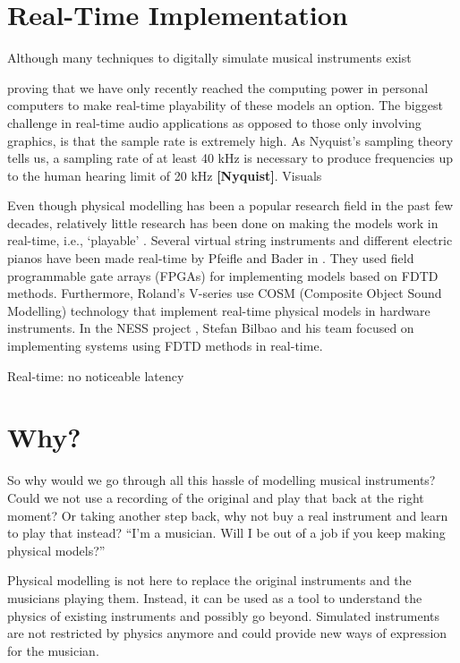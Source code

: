 \section{Real-Time Implementation}
Although many techniques to digitally simulate musical instruments exist

proving that we have only recently reached the computing power in personal computers to make real-time playability of these models an option. The biggest challenge in real-time audio applications as opposed to those only involving graphics, is that the sample rate is extremely high. As Nyquist's sampling theory tells us, a sampling rate of at least 40 kHz is necessary to produce frequencies up to the human hearing limit of 20 kHz \textbf{[Nyquist]}. Visuals 

Even though physical modelling has been a popular research field in the past few decades, relatively little research has been done on making the models work in real-time, i.e., `playable’ \cite{Mehes2016}. Several virtual string instruments and different electric pianos have been made real-time by Pfeifle and Bader in \cite{Pfeifle2012, Pfeifle2015, Pfeifle2017}. They used field programmable gate arrays (FPGAs) for implementing models based on FDTD methods. Furthermore, Roland’s V-series use COSM (Composite Object Sound Modelling) technology \cite{Bybee2019} that implement real-time physical models in hardware instruments. In the NESS project \cite{Bilbao2019CMJa,Bilbao2019CMJb}, Stefan Bilbao and his team focused on implementing systems using FDTD methods in real-time.

Real-time: no noticeable latency

\section{Why?}
So why would we go through all this hassle of modelling musical instruments? Could we not use a recording of the original and play that back at the right moment? Or taking another step back, why not buy a real instrument and learn to play that instead? ``I'm a musician. Will I be out of a job if you keep making physical models?''


Physical modelling is not here to replace the original instruments and the musicians playing them. Instead, it can be used as a tool to understand the physics of existing instruments and possibly go beyond. Simulated instruments are not restricted by physics anymore and could provide new ways of expression for the musician. 

